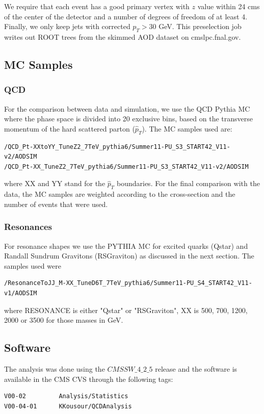We require that each event has a good primary vertex with $z$ value
within 24 cms of the center of the detector and a number of degrees of
freedom of at least 4. Finally, we only keep jets with corrected $p_T>30$ GeV.
This preselection job writes out ROOT trees from the skimmed AOD dataset
on cmslpc.fnal.gov.

\subsection{MC Samples}

\subsubsection{QCD}
For the comparison between data and simulation, we use the QCD Pythia
MC where the phase space is divided into 20 exclusive bins, based on
the transverse momentum of the hard scattered parton ($\hat{p}_T$).
The MC samples used are:
\begin{verbatim}
/QCD_Pt-XXtoYY_TuneZ2_7TeV_pythia6/Summer11-PU_S3_START42_V11-v2/AODSIM
/QCD_Pt-XX_TuneZ2_7TeV_pythia6/Summer11-PU_S3_START42_V11-v2/AODSIM
\end{verbatim}
where XX and YY stand for the $\hat{p}_T$ boundaries. For the final
comparison with the data, the MC samples are weighted according to the
cross-section and the number of events that were used.

\subsubsection{Resonances}
For resonance shapes we use the PYTHIA MC for excited quarks (Qstar)
and Randall Sundrum Gravitons (RSGraviton) as discussed in the next
section.  The samples used were
\begin{verbatim}
/ResonanceToJJ_M-XX_TuneD6T_7TeV_pythia6/Summer11-PU_S4_START42_V11-v1/AODSIM
\end{verbatim}
where RESONANCE is either "Qstar" or "RSGraviton", XX is 500, 700, 1200, 2000 or
3500 for those masses in GeV.

\subsection{Software}
The analysis was done using the 
$CMSSW\_4\_2\_5$ release and the software is available in the CMS CVS through the following
tags:
\begin{verbatim}
V00-02         Analysis/Statistics                              
V00-04-01      KKousour/QCDAnalysis 
\end{verbatim}

